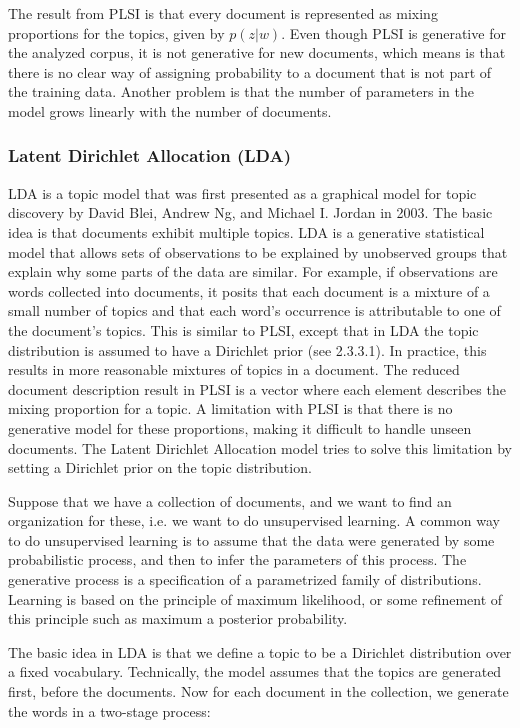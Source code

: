 \documentclass[12pt]{report}
\begin{document}
The result from PLSI is that every document is represented as mixing proportions
for the topics, given by $p(z|w)$. Even though PLSI is generative for the
analyzed corpus, it is not generative for new documents, which means is that
there is no clear way of assigning probability to a document that is not part
of the training data. Another problem is that the number of parameters in the
model grows linearly with the number of documents.


\subsubsection{Latent Dirichlet Allocation (LDA)}

LDA is a topic model that was first presented as a graphical model for topic
discovery by David Blei, Andrew Ng, and Michael I. Jordan in 2003. The basic
idea is that documents exhibit multiple topics. LDA is a generative statistical
model that allows sets of observations to be explained by unobserved groups
that explain why some parts of the data are similar. For example, if
observations are words collected into documents, it posits that each document
is a mixture of a small number of topics and that each word's occurrence is
attributable to one of the document's topics. This is similar to PLSI, except
that in LDA the topic distribution is assumed to have a Dirichlet prior (see
2.3.3.1). In practice, this results in more reasonable mixtures of topics in a
document. The reduced document description result in PLSI is a vector where
each element describes the mixing proportion for a topic. A limitation with
PLSI is that there is no generative model for these proportions, making it
difficult to handle unseen documents. The Latent Dirichlet Allocation model
tries to solve this limitation by setting a Dirichlet prior on the topic
distribution.
 
Suppose that we have a collection of documents, and we want to find an
organization for these, i.e. we want to do unsupervised learning. A common way
to do unsupervised learning is to assume that the data were generated by some
probabilistic process, and then to infer the parameters of this process. The
generative process is a specification of a parametrized family of
distributions. Learning is based on the principle of maximum likelihood, or
some refinement of this principle such as maximum a posterior probability.
 
The basic idea in LDA is that we define a topic to be a Dirichlet distribution
over a fixed vocabulary. Technically, the model assumes that the topics are
generated first, before the documents. Now for each document in the collection,
we generate the words in a two-stage process:
\end{document}
